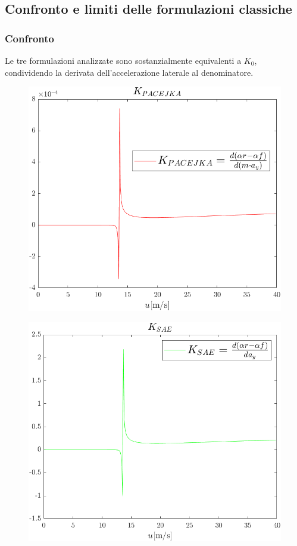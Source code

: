 \subsection{Confronto e limiti delle formulazioni classiche}

\subsubsection{Confronto}
Le tre formulazioni analizzate sono sostanzialmente equivalenti a $K_0$, condividendo la derivata 
dell'accelerazione laterale al denominatore.\\
\begin{figure}[!h]
    \centering
    \includegraphics[scale=0.5]{Immagini/Understeer Gradient/Kpacejka.png}
    \caption{}
    \label{fig:Kpacejka}
\end{figure}
\begin{figure}[!h]
    \centering
    \includegraphics[scale=0.5]{Immagini/Understeer Gradient/Ksae.png}
    \caption{}
    \label{fig:Ksae}
\end{figure}

